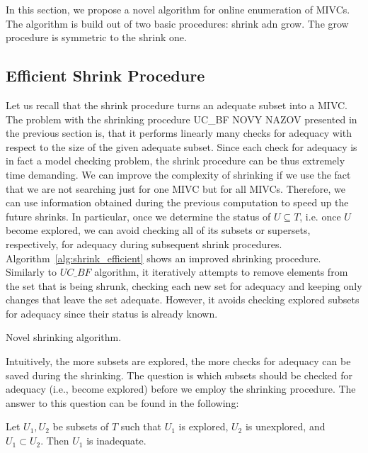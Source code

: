 In this section, we propose a novel algorithm for online enumeration of MIVCs. The algorithm is build out of two basic procedures: shrink adn grow. The grow procedure is symmetric to the shrink one.\\
 

\subsection{Efficient Shrink Procedure}
Let us recall that the shrink procedure  turns an adequate subset into a MIVC. The problem with the shrinking procedure UC\_BF NOVY NAZOV presented in the previous section is, that it performs linearly many checks for adequacy with respect to the size of the given  adequate subset. Since each check for adequacy is in fact a  model checking problem, the shrink procedure can be thus extremely time demanding.   
We can improve  the complexity of shrinking if we use the fact  that we are not searching just for   one MIVC but for all MIVCs. Therefore, we can use information obtained during the previous computation to speed up the future shrinks. In particular, once we determine the status of $U \subseteq T$, i.e. once $U$ become explored, we can avoid checking all of its subsets or supersets, respectively, for adequacy during subsequent shrink procedures. 
Algorithm~\ref{alg:shrink_efficient} shows an improved shrinking procedure. Similarly to $UC\_BF$ algorithm, it iteratively attempts to remove elements from the set that is being
shrunk, checking each new set for adequacy and keeping only changes that
leave the set adequate. However, it avoids checking explored subsets for adequacy since their status is already known.

\begin{algorithm}[!t]

\caption{Novel shrinking algorithm.}
\end{algorithm}

Intuitively, the more subsets are   explored, the more checks for adequacy can be saved during the shrinking. The question is which subsets should be checked for adequacy (i.e., become explored) before we employ the shrinking procedure. The answer to this question can be found in the following:

\begin{theorem}
\label{theorem:unex-prop}
Let $U_1, U_2$ be subsets of $T$ such that $U_1$ is explored, $U_2$ is unexplored, and $U_1 \subset U_2$. Then $U_1$ is inadequate.
\end{theorem}

